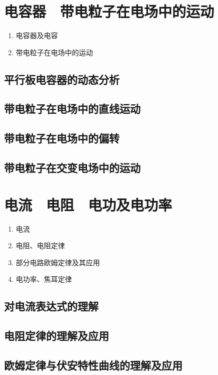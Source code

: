 \documentclass[cn,11pt,mac, simple]{elegantbook}
\begin{document}
\chapter{电容器　带电粒子在电场中的运动}
\begin{enumerate}
   \item 电容器及电容
   \item 带电粒子在电场中的运动
\end{enumerate}

\clearpage\section{平行板电容器的动态分析}

\clearpage\section{带电粒子在电场中的直线运动}

\clearpage\section{带电粒子在电场中的偏转}

\clearpage\section{带电粒子在交变电场中的运动}
\chapter{电流　电阻　电功及电功率}
\begin{enumerate}
   \item 电流
   \item 电阻、电阻定律
   \item 部分电路欧姆定律及其应用
   \item 电功率、焦耳定律
\end{enumerate}

\clearpage\section{对电流表达式的理解}

\clearpage\section{电阻定律的理解及应用}

\clearpage\section{欧姆定律与伏安特性曲线的理解及应用}
\end{document}

